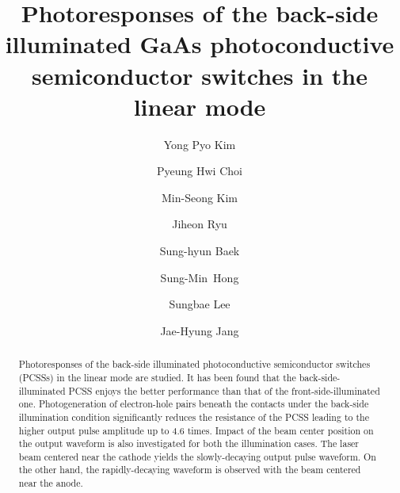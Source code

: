 \documentclass[final,5p,times,twocolumn]{elsarticle}
\newcommand{\revision}[1]{{#1}}
\begin{document}
\begin{frontmatter}



\title{Photoresponses of the back-side illuminated GaAs photoconductive semiconductor switches \revision{in the linear mode}}

\author[label1]{Yong Pyo Kim}
\author[label1]{Pyeung Hwi Choi}
\author[label2]{Min-Seong Kim}
\author[label2]{Jiheon Ryu}
\author[label2]{Sung-hyun Baek}
\author[label1]{Sung-Min~Hong}
\author[label1]{Sungbae Lee}
\author[label1]{Jae-Hyung Jang}

\address[label1]{Gwangju Institute of Science and Technology (GIST), Gwangju 61005, Korea}
\address[label2]{The 4th R\&D Institute, Agency for Defense Development, Korea}




\begin{abstract}
   Photoresponses of the back-side illuminated photoconductive semiconductor switches (PCSSs) \revision{in the linear mode} are studied.  
   It has been found that the back-side-illuminated PCSS enjoys the better performance than that of the front-side-illuminated one.
   Photogeneration of electron-hole pairs beneath the contacts under the back-side illumination condition significantly reduces the resistance of the PCSS leading to the higher output pulse amplitude up to 4.6 times.
   Impact of the beam center position on the output waveform is also investigated for both the illumination cases.
   The laser beam centered near the cathode yields the slowly-decaying output pulse waveform.
   On the other hand, the rapidly-decaying waveform is observed with the beam centered near the anode.
\end{abstract}


\end{frontmatter}
\end{document}
